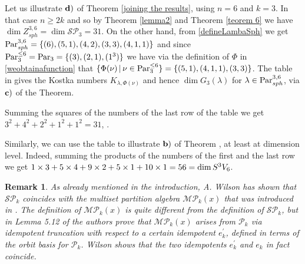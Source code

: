 \documentclass[10pt,hidelinks]{article}
\newcommand{\ParAlg}{{\mathcal P }_{k}}
\newcommand{\SpheAlg}{{\mathcal{SP} }_{k}}
\newcommand{\SpheAlgThree}{{\mathcal{SP} }_{3}}
\newcommand{\Par}{{\rm Par}   }
\newcommand{\ParSphThreeSix}{  \Par_{sph}^{3, 6}}
\newtheorem{remark}{Remark}
\numberwithin{equation}{section}
\begin{document}
Let us illustrate ${ \bf d)} $ of Theorem \ref{joining the results}, using $ n = 6 $ and $ k = 3$. In
that case $ n \ge 2k $ and so by  
Theorem \ref{lemma2} and Theorem \ref{teorem 6} we have 
$ \dim Z_{sph}^{ 3, 6} = \dim \SpheAlgThree = 31 $. On the other hand, from
\eqref{defineLambaSph} we get 
$  \ParSphThreeSix = \{ (6), (5,1), (4,2), (3,3), (4,1,1) \} $ and since
$ \Par_3^{\le 6} = \Par_3 = \{ (3), (2,1), (1^3) \} $ we have via the definition
of $ \Phi $ in \eqref{weobtainafunction} that 
$ \{ \Phi(\nu ) \, | \, \nu \in \Par_3^{\le 6} \} = \{ (5,1), (4,1,1), (3,3) \} $. 
The table in {} gives the Kostka numbers $ K_{\lambda, \Phi(\nu) } $ and hence 
$ \dim G_3(\lambda) $ for $ \lambda \in  \Par_{sph}^{3,6}$, via ${ \bf c)} $ of the Theorem. 

\medskip
Summing the squares of the numbers of the last row of the table we get $ 3^2+ 4^2 + 2^2 +1^2 + 1^2 = 31$,
{\color{black}{as expected}}. 



\medskip
Similarly, we can use the table to illustrate ${ \bf b)} $ of Theorem
{\color{black}{\ref{joining the results}}}, at least at dimension level.
Indeed, summing the products of the numbers of the first and the last row we
get $ 1 \times 3 + 5 \times 4 + 9 \times 2 + 5 \times 1 +  10\times 1  = 56 =
\dim S^{ \color{black}{3}} V_{\color{black}{6}} $.  



\begin{remark}
  \normalfont
  As already mentioned in the introduction, A. Wilson has shown that $ \SpheAlg $ coincides with the
  multiset partition algebra $ \mathcal{MP}_k(x) $ that was introduced in \cite{NaPaulSriva}. The definition
  of $ \mathcal{MP}_k(x) $ is quite different from the definition of $ \SpheAlg $, but in Lemma 5.12 of 
  \cite{NaPaulSriva} the authors prove that $ \mathcal{MP}_k(x) $ arises from $ \ParAlg $ via idempotent truncation
  with respect to a certain idempotent $  e_k^{\prime}$, defined in terms of the {\it orbit basis} for $ \ParAlg $. 
Wilson shows that 
the two idempotents $  e_k^{\prime}$ and $     e_k$ in fact coincide. 
\end{remark}
\end{document}
